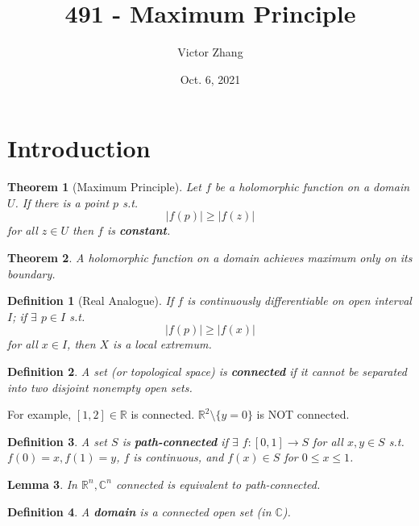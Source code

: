 \documentclass{article}
\title{491 - Maximum Principle}
\author{Victor Zhang}
\date{Oct. 6, 2021}
\newtheorem{theorem}{Theorem}
\newtheorem{definition}{Definition}
\newtheorem{lemma}[theorem]{Lemma}
\begin{document}
\maketitle

\section{Introduction}
\begin{theorem}[Maximum Principle]
Let $f$ be a holomorphic function on a domain $U$. If there is a point $p$ s.t.
$$|f(p)| \geq |f(z)|$$
for all $z \in U$ then $f$ is \textbf{constant}.
\end{theorem}

\begin{theorem}
A holomorphic function on a domain achieves maximum only on its boundary.
\end{theorem}

\begin{definition}[Real Analogue]
If $f$ is continuously differentiable on open interval $I$; if $\exists$ $p \in I$ s.t.
$$|f(p)| \geq |f(x)|$$
for all $x \in I$, then $X$ is a local extremum.
\end{definition}

\begin{definition}
A set (or topological space) is \textbf{connected} if it cannot be separated into two disjoint nonempty open sets.
\end{definition}

For example, $[1,2] \in \mathbb{R}$ is connected. $\mathbb{R}^2 \setminus \{y = 0\}$ is NOT connected.

\begin{definition}
A set $S$ is \textbf{path-connected} if $\exists$ $f : [0,1] \to S$ for all $x,y \in S$ s.t. $f(0) = x, f(1) = y$, $f$ is continuous, and $f(x) \in S$ for $0 \leq x \leq 1$.
\end{definition}

\begin{lemma}
In $\mathbb{R}^n, \mathbb{C}^n$ connected is equivalent to path-connected.
\end{lemma}

\begin{definition}
A \textbf{domain} is a connected open set (in $\mathbb{C}$).
\end{definition}
\end{document}
